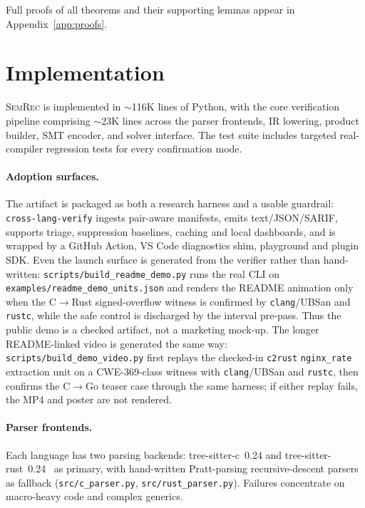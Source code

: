 \documentclass[10pt,a4paper]{article}
\begin{document}
Full proofs of all theorems and their supporting lemmas appear in
Appendix~\ref{app:proofs}.


\section{Implementation}\label{sec:implementation}

\textsc{SemRec} is implemented in ${\sim}$116K lines of Python,
with the core verification pipeline comprising ${\sim}$23K lines
across the parser frontends, IR lowering, product builder, SMT
encoder, and solver interface.  The test suite includes targeted
real-compiler regression tests for every confirmation mode.

\paragraph{Adoption surfaces.}
The artifact is packaged as both a research harness and a usable guardrail:
\texttt{cross-lang-verify} ingests pair-aware manifests, emits text/JSON/SARIF,
supports triage, suppression baselines, caching and local dashboards, and is
wrapped by a GitHub Action, VS Code diagnostics shim, playground and plugin SDK.
Even the launch surface is generated from the verifier rather than hand-written:
\texttt{scripts/build\_readme\_demo.py} runs the real CLI on
\texttt{examples/readme\_demo\_units.json} and renders the README animation only
when the C$\to$Rust signed-overflow witness is confirmed by
\texttt{clang}/UBSan and \texttt{rustc}, while the safe control is discharged by
the interval pre-pass.  Thus the public demo is a checked artifact, not a
marketing mock-up.  The longer README-linked video is generated the same way:
\texttt{scripts/build\_demo\_video.py} first replays the checked-in
\texttt{c2rust} \texttt{nginx\_rate} extraction unit on a CWE-369-class witness
with \texttt{clang}/UBSan and \texttt{rustc}, then confirms the C$\to$Go teaser
case through the same harness; if either replay fails, the MP4 and poster are not
rendered.

\paragraph{Parser frontends.}
Each language has two parsing backends: tree-sitter-c~0.24 and
tree-sitter-rust~0.24~\cite{treesitter2024} as primary, with
hand-written Pratt-parsing recursive-descent
parsers~\cite{pratt1973top} as fallback (\texttt{src/c\_parser.py},
\texttt{src/rust\_parser.py}).  Failures concentrate on macro-heavy code and complex generics.
\end{document}
